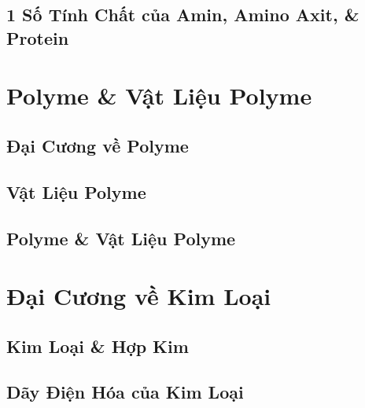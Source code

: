 \documentclass{article}
\numberwithin{equation}{section}
\begin{document}
\subsection{1 Số Tính Chất của Amin, Amino Axit, \& Protein}


\section{Polyme \& Vật Liệu Polyme}

\subsection{Đại Cương về Polyme}


\subsection{Vật Liệu Polyme}


\subsection{Polyme \& Vật Liệu Polyme}


\section{Đại Cương về Kim Loại}

\subsection{Kim Loại \& Hợp Kim}


\subsection{Dãy Điện Hóa của Kim Loại}

\end{document}
